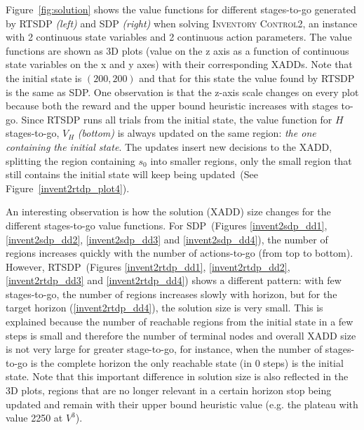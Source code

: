 \documentclass[letterpaper]{article}
\newcommand{\Invent}{\textsc{Inventory Control}}
\begin{document}
Figure~\ref{fig:solution} shows the value functions for different stages-to-go generated by RTSDP \emph{(left)} and SDP \emph{(right)} when solving \Invent2, an instance with 2 continuous state variables and 2 continuous action parameters. The value functions are shown as 3D plots (value on the z axis as a function of continuous state variables on the x and y axes) with their corresponding XADDs. Note that the initial state is $(200,200)$ and that for this state the value found by RTSDP is the same as SDP. One observation is that the z-axis scale changes on every plot because both the reward and the upper bound heuristic increases with stages to-go.
Since RTSDP runs all trials from the initial state, the value function for $H$ stages-to-go, $V_H$ {\it (bottom)} is always updated on the same region: \emph{the one containing the initial state}.
The updates insert new decisions to the XADD, splitting the region containing $s_0$ into smaller regions, only the small region that still contains the initial state will keep being updated~(See Figure~\ref{invent2rtdp_plot4}).

An interesting observation is how the solution (XADD) size %
changes for the different stages-to-go value functions. For SDP~(Figures \ref{invent2sdp_dd1}, \ref{invent2sdp_dd2}, \ref{invent2sdp_dd3} and \ref{invent2sdp_dd4}), the number of regions increases quickly with the number of actions-to-go (from top to bottom).
However, RTSDP~(Figures \ref{invent2rtdp_dd1}, \ref{invent2rtdp_dd2}, \ref{invent2rtdp_dd3} and \ref{invent2rtdp_dd4}) shows a different pattern: with few stages-to-go, the number of regions increases slowly with horizon, but for the target horizon (\ref{invent2rtdp_dd4}), the solution size is very small. This is explained because the number of reachable regions from the initial state in a few steps is small and therefore the number of terminal nodes and overall XADD size is not very large for greater stage-to-go, for instance, when the number of stages-to-go is the complete horizon the only reachable state (in 0 steps) is the initial state.
Note that this important difference in solution size is also reflected in the 3D plots, regions that are no longer relevant in a certain horizon stop being updated and remain with their upper bound heuristic value (e.g. the plateau with value 2250 at $V^3$).
\end{document}
